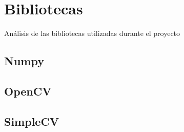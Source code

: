 \chapter{Bibliotecas}
Análisis de las bibliotecas utilizadas durante el proyecto
\section{Numpy}
\section{OpenCV}
\section{SimpleCV}
